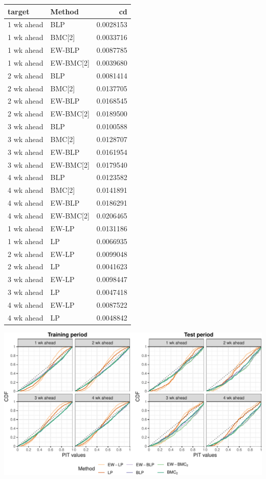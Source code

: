 \documentclass[
]{article}
\begin{document}
\begin{tabular}{l|l|r}
\hline
target & Method & cd\\
\hline
1 wk ahead & BLP & 0.0028153\\
\hline
1 wk ahead & BMC[2] & 0.0033716\\
\hline
1 wk ahead & EW-BLP & 0.0087785\\
\hline
1 wk ahead & EW-BMC[2] & 0.0039680\\
\hline
2 wk ahead & BLP & 0.0081414\\
\hline
2 wk ahead & BMC[2] & 0.0137705\\
\hline
2 wk ahead & EW-BLP & 0.0168545\\
\hline
2 wk ahead & EW-BMC[2] & 0.0189500\\
\hline
3 wk ahead & BLP & 0.0100588\\
\hline
3 wk ahead & BMC[2] & 0.0128707\\
\hline
3 wk ahead & EW-BLP & 0.0161954\\
\hline
3 wk ahead & EW-BMC[2] & 0.0179540\\
\hline
4 wk ahead & BLP & 0.0123582\\
\hline
4 wk ahead & BMC[2] & 0.0141891\\
\hline
4 wk ahead & EW-BLP & 0.0186291\\
\hline
4 wk ahead & EW-BMC[2] & 0.0206465\\
\hline
1 wk ahead & EW-LP & 0.0131186\\
\hline
1 wk ahead & LP & 0.0066935\\
\hline
2 wk ahead & EW-LP & 0.0099048\\
\hline
2 wk ahead & LP & 0.0041623\\
\hline
3 wk ahead & EW-LP & 0.0098447\\
\hline
3 wk ahead & LP & 0.0047418\\
\hline
4 wk ahead & EW-LP & 0.0087522\\
\hline
4 wk ahead & LP & 0.0048842\\
\hline
\end{tabular}

\begin{center}\includegraphics[width=576px]{plot_calibration_files/figure-latex/reli_main-1} \end{center}
\end{document}
